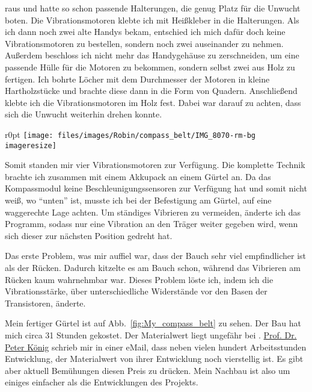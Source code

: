 raus und hatte so schon passende Halterungen, die genug Platz für die Unwucht boten. Die Vibrationsmotoren
klebte ich mit Heißkleber in die Halterungen. Als ich dann noch zwei alte Handys %
bekam, entschied ich mich dafür doch keine Vibrationsmotoren zu bestellen, sondern noch zwei auseinander zu
nehmen. Außerdem beschloss ich nicht mehr das Handygehäuse zu zerschneiden, um eine passende Hülle für die
Motoren zu bekommen, sondern selbst zwei aus Holz zu fertigen. Ich bohrte Löcher mit dem Durchmesser der
Motoren in kleine Hartholzstücke und brachte diese dann in die Form von Quadern. Anschließend klebte ich
die Vibrationsmotoren im Holz fest. Dabei war darauf zu achten, dass sich die Unwucht weiterhin drehen
konnte.

\begin{wrapfigure}{r}{0pt}
	\texttt{[image: files/images/Robin/compass\_belt/IMG\_8070-rm-bg\\imageresize]}
	\label{fig:motors_compass_belt}
\end{wrapfigure}

Somit standen mir vier Vibrationsmotoren zur Verfügung.
Die komplette Technik brachte ich zusammen mit einem Akkupack
an einem Gürtel an. Da das Kompassmodul keine Beschleunigungssensoren zur Verfügung hat und somit
nicht weiß, wo \enquote{unten} ist, musste ich bei der Befestigung am Gürtel, auf eine waggerechte
Lage achten. Um ständiges Vibrieren zu vermeiden, änderte ich das Programm, sodass
nur eine Vibration an den Träger weiter gegeben wird, wenn sich dieser zur nächsten Position gedreht
hat.

Das erste Problem, was mir auffiel war, dass der Bauch sehr viel empfindlicher ist als der Rücken.
Dadurch kitzelte es am Bauch schon, während das Vibrieren am Rücken kaum wahrnehmbar war. Dieses
Problem löste ich, indem ich die Vibrationsstärke, über unterschiedliche Widerstände
vor den Basen der Transistoren, änderte.

Mein fertiger Gürtel ist auf Abb.~\vref{fig:My_compass_belt} zu sehen. Der Bau hat mich circa 31
Stunden gekostet. Der Materialwert liegt ungefähr bei .
\href{http://www.cogsci.uni-osnabrueck.de/NBP/peterhome.html}%
{Prof. Dr. Peter König} schrieb mir
in einer eMail, dass neben vielen hundert Arbeitsstunden Entwicklung, der Materialwert
von ihrer Entwicklung noch vierstellig ist.
Es gibt aber aktuell Bemühungen diesen Preis zu drücken.
Mein Nachbau ist also um einiges einfacher als die Entwicklungen des \Linkfeelspace{} Projekts.

